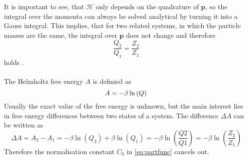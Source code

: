 It is important to see, that $\mathcal{H}$ only depends on the quadrature of $\mathbf{p}$, so the integral over the momenta can always be solved analytical by turning it into a Gauss integral. This implies, that for two related systems, in which the particle masses are the same, the integral over $\mathbf{p}$ does not change and therefore
\begin{equation}
\frac{Q_2}{Q_1} = \frac{Z_2}{Z_1}
\end{equation}
holds \autocite[17]{freeEnergyBook}.\\
\\
The Helmholtz free energy $A$ is definied as
\begin{equation}
	A = - \beta \ln\left(Q\right)\\
\end{equation}
Usually the exact value of the free energy is unknown, but the main interest lies in free energy differences between two states of a system. The difference $\Delta A$ can be written as
\begin{equation}
\Delta A = A_2 - A_1 = - \beta \ln\left(Q_2\right) + \beta \ln\left(Q_1\right) = -\beta \ln\left(\frac{Q2}{Q1}\right) = -\beta \ln \left(\frac{Z_2}{Z_1}\right)
\end{equation}
Therefore the normalisation constant $C_0$ in \autoref{eq:partfunc} cancels out.
